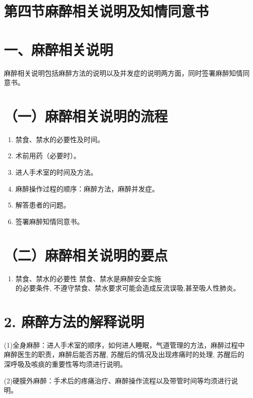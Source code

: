 \documentclass[10pt]{article}
\begin{document}
\section*{第四节麻醉相关说明及知情同意书}
\section*{一、麻醉相关说明}
麻醉相关说明包括麻醉方法的说明以及并发症的说明两方面，同时签署麻醉知情同意书。

\section*{（一）麻醉相关说明的流程}
\begin{enumerate}
  \item 禁食、禁水的必要性及时间。

  \item 术前用药（必要时）。

  \item 进人手术室的时间及方法。

  \item 麻醉操作过程的顺序：麻醉方法，麻醉并发症。

  \item 解答患者的问题。

  \item 签署麻醉知情同意书。

\end{enumerate}

\section*{（二）麻醉相关说明的要点}
\begin{enumerate}
  \item 禁食、禁水的必要性 禁食、禁水是麻醉安全实施\\
的必要条件, 不遵守禁食、禁水要求可能会造成反流误吸,甚至吸人性肺炎。
\end{enumerate}

\section*{2. 麻醉方法的解释说明}
(1)全身麻醉：进人手术室的顺序，如何进人睡眠，气道管理的方法，麻醉过程中麻醉医生的职责，麻醉后能否苏醒, 苏醒后的情况及出现疼痛时的处理, 苏醒后的深呼吸及咳痰的重要性等均须进行说明。

(2)硬膜外麻醉：手术后的疼痛治疗、麻醉操作流程以及带管时间等均须进行说明。
\end{document}
